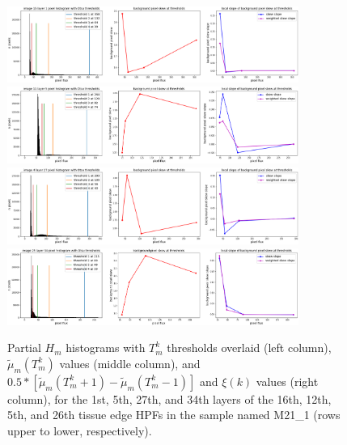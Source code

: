 \documentclass[letterpaper,11pt]{article}
\begin{document}
\begin{figure}[!ht]
\centering
\includegraphics[width=0.85\textwidth]{images/masking/thresholds_image_15_layer_1}
\includegraphics[width=0.85\textwidth]{images/masking/thresholds_image_11_layer_5}
\includegraphics[width=0.85\textwidth]{images/masking/thresholds_image_4_layer_27}
\includegraphics[width=0.85\textwidth]{images/masking/thresholds_image_25_layer_34}
\caption{\footnotesize Partial $H_{m}$ histograms with $T^{k}_{m}$ thresholds overlaid (left column), $\widetilde{\mu}_{m}(T^{k}_{m})$ values (middle column), and $0.5*\left[\widetilde{\mu}_{m}(T^{k}_{m}+1) - \widetilde{\mu}_{m}(T^{k}_{m}-1)\right]$ and $\xi(k)$ values (right column), for the 1st, 5th, 27th, and 34th layers of the 16th, 12th, 5th, and 26th tissue edge HPFs in the sample named M21\_1 (rows upper to lower, respectively).}
\label{fig:histograms_with_otsu_thresholds}
\end{figure}
\end{document}
